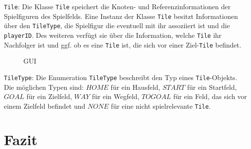 \documentclass[conference]{IEEEtran}
\begin{document}
\texttt{Tile}: Die Klasse \texttt{Tile} speichert die Knoten- und Referenzinformationen der Spielfiguren des Spielfelds. Eine Instanz der Klasse \texttt{Tile} besitzt Informationen \"uber den \texttt{TileType}, die Spielfigur die eventuell mit ihr assoziiert ist und die \texttt{playerID}. Des weiteren verf\"ugt sie \"uber die Information, welche \texttt{Tile} ihr Nachfolger ist und ggf. ob es eine \texttt{Tile} ist, die sich vor einer Ziel-\texttt{Tile} befindet. \\
\begin{figure}[]
    \centering
    \caption{GUI}
\end{figure}
\texttt{TileType}: Die Enumeration \texttt{TileType} beschreibt den Typ eines \texttt{Tile}-Objekts. Die m\"oglichen Typen sind: $HOME$ f\"ur ein Hausfeld, $START$ f\"ur ein Startfeld, $GOAL$ f\"ur ein Zielfeld, $WAY$ f\"ur ein Wegfeld, $TOGOAL$ f\"ur ein Feld, das sich vor einem Zielfeld befindet und $NONE$ f\"ur eine nicht spielrelevante \texttt{Tile}. \\

\section{Fazit}
\end{document}
